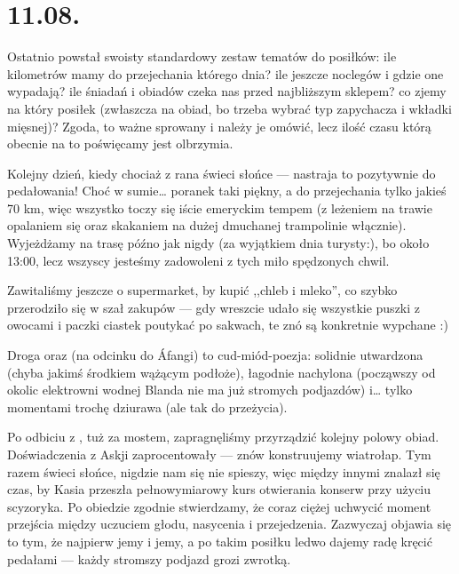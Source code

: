 \chapter*{11.08.}


Ostatnio powstał swoisty standardowy zestaw tematów do posiłków: ile kilometrów mamy do przejechania którego dnia? ile jeszcze noclegów i gdzie one wypadają? ile śniadań i obiadów czeka nas przed najbliższym sklepem? co zjemy na który posiłek (zwłaszcza na obiad, bo trzeba wybrać typ zapychacza i wkładki mięsnej)? Zgoda, to ważne sprowany i należy je omówić, lecz ilość czasu którą obecnie na to poświęcamy jest olbrzymia.

Kolejny dzień, kiedy chociaż z rana świeci słońce --- nastraja to pozytywnie do pedałowania! Choć w sumie… poranek taki piękny, a do przejechania tylko jakieś 70 km, więc wszystko toczy się iście emeryckim tempem (z leżeniem na trawie opalaniem się oraz skakaniem na dużej dmuchanej trampolinie włącznie). Wyjeżdżamy na trasę późno jak nigdy (za wyjątkiem dnia turysty:), bo około 13:00, lecz  wszyscy jesteśmy zadowoleni z tych miło spędzonych chwil.


Zawitaliśmy jeszcze o supermarket, by kupić ,,chleb i mleko'', co szybko przerodziło się w szał zakupów --- gdy wreszcie udało się wszystkie puszki z owocami i paczki ciastek poutykać po sakwach, te znó są konkretnie wypchane :)

Droga  oraz  (na odcinku do Áfangi) to cud-miód-poezja: solidnie utwardzona (chyba jakimś środkiem wążącym podłoże), łagodnie nachylona (począwszy od okolic elektrowni wodnej Blanda nie ma już stromych podjazdów) i… tylko momentami trochę dziurawa (ale tak do przeżycia).

Po odbiciu z , tuż za mostem, zapragnęliśmy przyrządzić kolejny polowy obiad. Doświadczenia z Askji zaprocentowały --- znów konstruujemy wiatrołap. Tym razem świeci słońce, nigdzie nam się nie spieszy, więc między innymi znalazł się czas, by Kasia przeszła pełnowymiarowy kurs otwierania konserw przy użyciu scyzoryka. Po obiedzie zgodnie stwierdzamy, że coraz ciężej uchwycić moment przejścia między uczuciem głodu, nasycenia i przejedzenia. Zazwyczaj objawia się to tym, że najpierw jemy i jemy, a po takim posiłku ledwo dajemy radę kręcić pedałami --- każdy stromszy podjazd grozi zwrotką.

